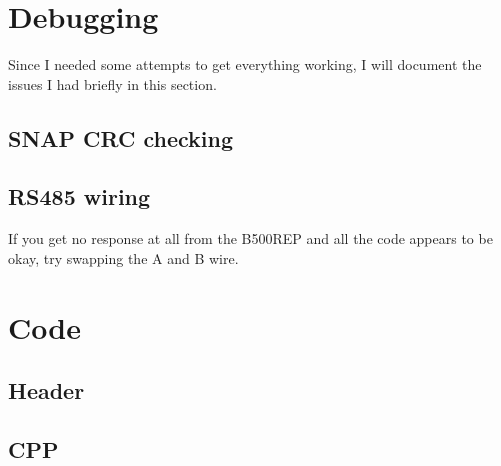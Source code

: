 \documentclass{article}
\begin{document}
\section{Debugging}
Since I needed some attempts to get everything working, I will document the issues I had briefly in this section.

\subsection{SNAP CRC checking}

\subsection{RS485 wiring}
If you get no response at all from the B500REP and all the code appears to be okay, try swapping the A and B wire.

\section{Code}

\subsection{Header}


\subsection{CPP}

\end{document}
